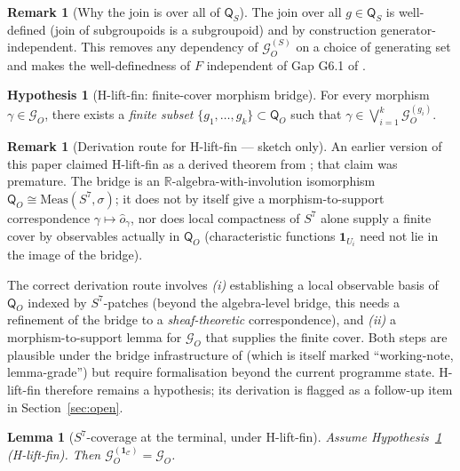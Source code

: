 \documentclass[11pt, a4paper]{amsart}
\newtheorem{lemma}[theorem]{Lemma}
\theoremstyle{definition}
\newtheorem{remark}[theorem]{Remark}
\newtheorem{hypothesis}[theorem]{Hypothesis}
\newcommand{\R}{\mathbb{R}}
\newcommand{\catC}{\mathcal{C}}
\newcommand{\Gcal}{\mathcal{G}}
\newcommand{\Qalg}{\mathsf{Q}}
\begin{document}
\begin{remark}[Why the join is over all of $\Qalg_S$]
\label{rmk:gen-independence}
The join over all $g \in \Qalg_S$ is well-defined (join of
subgroupoids is a subgroupoid) and by construction
generator-independent. This removes any dependency of
$\Gcal_O^{(S)}$ on a choice of generating set and makes the
well-definedness of $F$ independent of Gap G6.1 of
\cite{CascadeObserverQueryAlgebra}.
\end{remark}

\begin{hypothesis}[H-lift-fin: finite-cover morphism bridge]
\label{hyp:lift}
For every morphism $\gamma \in \Gcal_O$, there exists a
\emph{finite subset} $\{g_1, \ldots, g_k\} \subset \Qalg_O$
such that $\gamma \in \bigvee_{i=1}^k \Gcal_O^{(g_i)}$.
\end{hypothesis}

\begin{remark}[Derivation route for H-lift-fin — sketch only]
\label{rmk:H-lift-status}
An earlier version of this paper claimed H-lift-fin as a
derived theorem from \cite{CascadeQOBridge}; that claim was
premature. The bridge is an $\R$-algebra-with-involution
isomorphism $\Qalg_O \cong \mathrm{Meas}(S^7, \sigma)$; it
does not by itself give a morphism-to-support correspondence
$\gamma \mapsto \hat o_\gamma$, nor does local compactness of
$S^7$ alone supply a finite cover by observables actually in
$\Qalg_O$ (characteristic functions $\mathbf{1}_{U_i}$ need not
lie in the image of the bridge).

The correct derivation route involves \emph{(i)} establishing a
local observable basis of $\Qalg_O$ indexed by $S^7$-patches
(beyond the algebra-level bridge, this needs a refinement of
the bridge to a \emph{sheaf-theoretic} correspondence), and
\emph{(ii)} a morphism-to-support lemma for $\Gcal_O$ that
supplies the finite cover. Both steps are plausible under the
bridge infrastructure of \cite{CascadeQOBridge} (which is
itself marked ``working-note, lemma-grade'') but require
formalisation beyond the current programme state. H-lift-fin
therefore remains a hypothesis; its derivation is flagged as a
follow-up item in Section~\ref{sec:open}.
\end{remark}

\begin{lemma}[$S^7$-coverage at the terminal, under H-lift-fin]
\label{lem:S7-coverage}
Assume Hypothesis~\ref{hyp:lift} (H-lift-fin). Then
$\Gcal_O^{(\mathbf{1}_\catC)} = \Gcal_O$.
\end{lemma}
\end{document}
